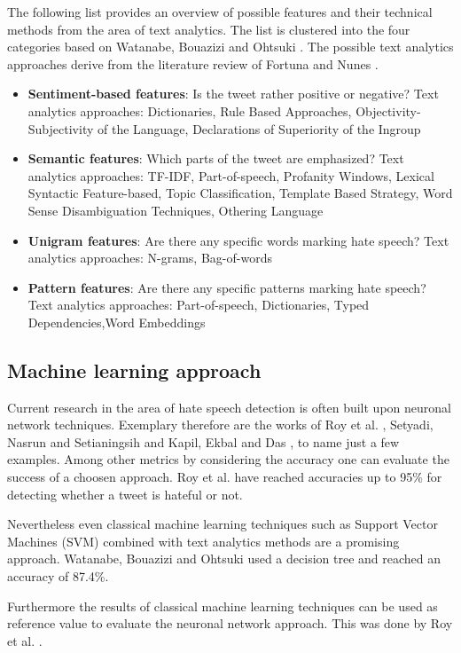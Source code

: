 The following list provides an overview of possible features and their technical methods from the area of text analytics. The list is clustered into the four categories based on Watanabe, Bouazizi and Ohtsuki \cite{Watanabe.2018}. The possible text analytics approaches derive from the literature review of Fortuna and Nunes \cite{Fortuna.2018}.
\begin{itemize}
	\item \textbf{Sentiment-based features}: Is the tweet rather positive or negative? \newline
	Text analytics approaches: Dictionaries, Rule Based Approaches, Ob\-jec\-ti\-vi\-ty-Subjectivity of the Language, Declarations of Superiority of the Ingroup \cite{Fortuna.2018}
	\item \textbf{Semantic features}: Which parts of the tweet are emphasized? \newline
	Text analytics approaches: TF-IDF, Part-of-speech, Profanity Windows, Lexical Syntactic Feature-based, Topic Classification, Template Based Strategy, Word Sense Disambiguation Techniques, Othering Language \cite{Fortuna.2018}
	\item \textbf{Unigram features}: Are there any specific words marking hate speech? \newline
	Text analytics approaches: N-grams, Bag-of-words \cite{Fortuna.2018}
	\item \textbf{Pattern features}: Are there any specific patterns marking hate speech? \newline
	Text analytics approaches: Part-of-speech, Dictionaries, Typed De\-pen\-den\-cies,Word Embeddings \cite{Fortuna.2018}
\end{itemize}


\subsection{Machine learning approach}

Current research in the area of hate speech detection is often built upon neuronal network techniques. Exemplary therefore are the works of Roy et al. \cite{Roy.2020}, Setyadi, Nasrun and Setianingsih \cite{NabiilaAdaniSetyadi.2018} and Kapil, Ekbal and Das \cite{Kapil.2020}, to name just a few examples. Among other metrics by considering the accuracy one can evaluate the success of a choosen approach. Roy et al. \cite{Roy.2020} have reached accuracies up to 95\% for detecting whether a tweet is hateful or not.

Nevertheless even classical machine learning techniques such as Support Vector Machines (SVM) combined with text analytics methods are a promis\-ing approach.
Watanabe, Bouazizi and Ohtsuki \cite{Watanabe.2018} used a decision tree and reached an accuracy of 87.4\%.

Furthermore the results of classical machine learning techniques can be used as reference value to evaluate the neuronal network approach. This was done by Roy et al. \cite{Roy.2020}.
